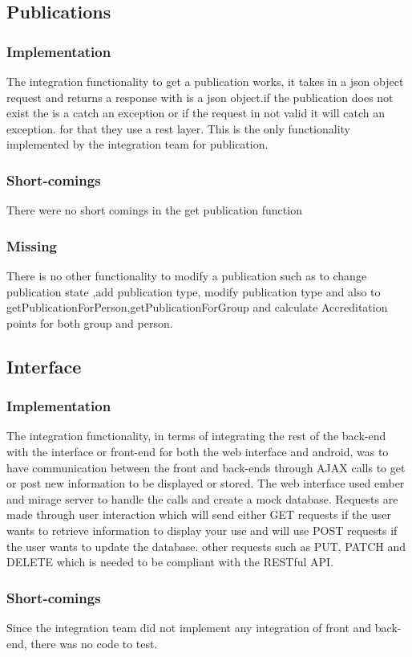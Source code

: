 \documentclass{article}
\begin{document}
	\subsection{Publications}
		\subsubsection{Implementation}
			The integration functionality to get a publication works, it takes in a json object request and returns a response with is a json object.if the publication does not exist the is a catch an exception or if the request in not valid it will catch an exception. for that they use a rest layer. This is the only functionality implemented by the integration team for publication.
		\subsubsection{Short-comings}
		There were no short comings in the get publication function
		\subsubsection{Missing}
		There is no other functionality to modify a publication such as to change publication state ,add publication type, modify publication type and also to getPublicationForPerson,getPublicationForGroup and calculate Accreditation points for both group and person.
		
    \subsection{Interface}
        \subsubsection{Implementation}
        The integration functionality, in terms of integrating the rest of the back-end with the interface or front-end for both the web interface and android, was to have communication between the front and back-ends through AJAX calls to get or post new information to be displayed or stored. The web interface used ember and mirage server to handle the calls and create a mock database. Requests are made through user interaction which will send either GET requests if the user wants to retrieve information to display your use and will use POST requests if the user wants to update the database. other requests such as PUT, PATCH and DELETE which is needed to be compliant with the RESTful API.
        \subsubsection{Short-comings}
        Since the integration team did not implement any integration of front and back-end, there was no code to test.
\end{document}
